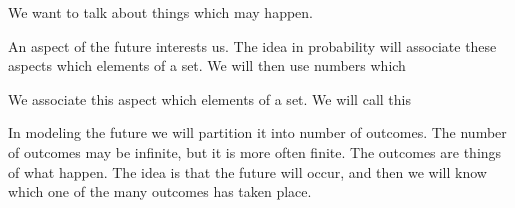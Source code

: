 

We want to talk about
things which may happen.


An aspect of the future
interests us. The idea
in probability will associate
these aspects which elements
of a set.
We will then use numbers which

We associate
this aspect which elements
of a set.
We will call this

In modeling the future we will partition it
into number of outcomes. The number of outcomes
may be infinite, but it is more often finite.
The outcomes are things of what happen. The idea
is that the future will occur, and then we will
know which one of the many outcomes has taken place.
